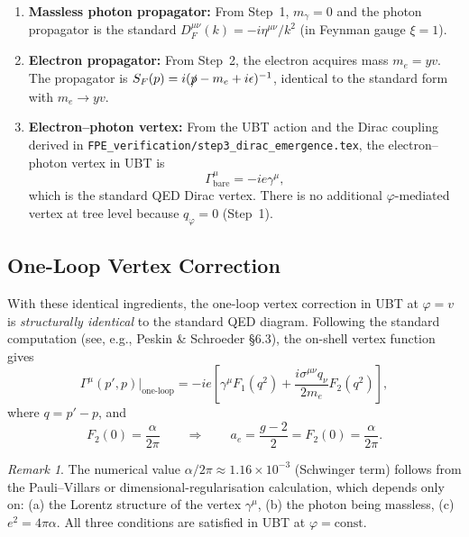 \documentclass[12pt]{article}
\theoremstyle{definition}
\theoremstyle{remark}
\newtheorem{remark}[theorem]{Remark}
\begin{document}
\begin{enumerate}
  \item \textbf{Massless photon propagator:}
        From Step~1, $m_\gamma = 0$ and the photon propagator is the standard
        $D_F^{\mu\nu}(k) = -i\eta^{\mu\nu}/k^2$ (in Feynman gauge $\xi=1$).

  \item \textbf{Electron propagator:}
        From Step~2, the electron acquires mass $m_e = yv$.  The propagator is
        $S_F(p) = i(\slashed{p} - m_e + i\epsilon)^{-1}$, identical to the standard
        form with $m_e \to yv$.

  \item \textbf{Electron--photon vertex:}
        From the UBT action and the Dirac coupling derived in
        \texttt{FPE\_verification/step3\_dirac\_emergence.tex}, the
        electron--photon vertex in UBT is
        \begin{equation}
          \Gamma^\mu_\mathrm{bare} = -ie\gamma^\mu,
        \end{equation}
        which is the standard QED Dirac vertex.  There is no additional $\varphi$-mediated
        vertex at tree level because $q_\varphi = 0$ (Step~1).
\end{enumerate}

\subsection{One-Loop Vertex Correction}

With these identical ingredients, the one-loop vertex correction in UBT at $\varphi = v$
is \emph{structurally identical} to the standard QED diagram.  Following the standard
computation (see, e.g., Peskin \& Schroeder §6.3), the on-shell vertex function gives
\begin{equation}
  \Gamma^\mu(p',p)\big|_\text{one-loop}
  = -ie\left[\gamma^\mu F_1(q^2) + \frac{i\sigma^{\mu\nu}q_\nu}{2m_e}F_2(q^2)\right],
\end{equation}
where $q = p' - p$, and
\begin{equation}
  F_2(0) = \frac{\alpha}{2\pi}
  \qquad\Rightarrow\qquad
  a_e = \frac{g-2}{2} = F_2(0) = \frac{\alpha}{2\pi}.
\end{equation}

\begin{remark}
  The numerical value $\alpha/2\pi \approx 1.16\times10^{-3}$ (Schwinger term) follows
  from the Pauli--Villars or dimensional-regularisation calculation, which depends only on:
  (a) the Lorentz structure of the vertex $\gamma^\mu$,
  (b) the photon being massless,
  (c) $e^2 = 4\pi\alpha$.
  All three conditions are satisfied in UBT at $\varphi = \mathrm{const}$.
\end{remark}
\end{document}
